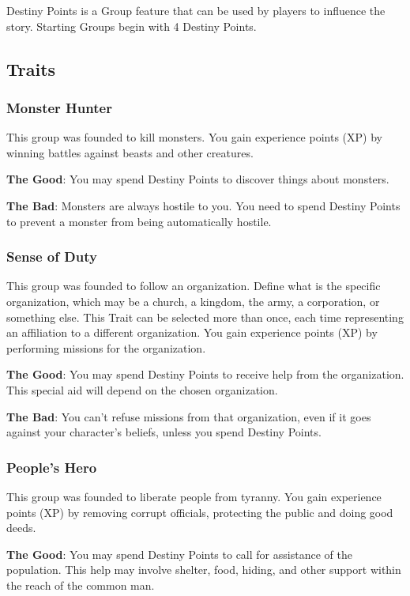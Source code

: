 \begin{multicols}{2}
\begin{enumerate}
Destiny Points is a Group feature that can be used by players to influence the story. Starting Groups begin with 4 Destiny Points.
\end{enumerate}
\subsection{Traits}
\label{subsec:traits}
\subsubsection{Monster Hunter}
This group was founded to kill monsters. You gain experience points (XP) by winning battles against beasts and other creatures.

\textbf{The Good}: You may spend Destiny Points to discover things about monsters.

\textbf{The Bad}: Monsters are always hostile to you. You need to spend Destiny Points to prevent a monster from being automatically hostile.

\subsubsection{Sense of Duty}
This group was founded to follow an organization. Define what is the specific organization, which may be a church, a kingdom, the army, a corporation, or something else. This Trait can be selected more than once, each time representing an affiliation to a different organization. You gain experience points (XP) by performing missions for the organization.

\textbf{The Good}: You may spend Destiny Points to receive help from the organization. This special aid will depend on the chosen organization.

\textbf{The Bad}: You can’t refuse missions from that organization, even if it goes against your character’s beliefs, unless you spend Destiny Points.

\subsubsection{People’s Hero}
This group was founded to liberate people from tyranny. You gain experience points (XP) by removing corrupt officials, protecting the public and doing good deeds.

\textbf{The Good}: You may spend Destiny Points to call for assistance of the population. This help may involve shelter, food, hiding, and other support within the reach of the common man.


\end{multicols}
